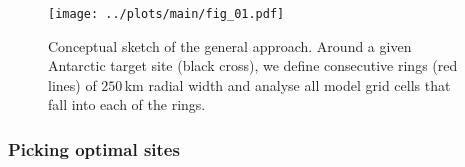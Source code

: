\documentclass[cp, manuscript, draft]{copernicus}
\begin{document}
\begin{figure}[t]%
\centering
\texttt{[image: ../plots/main/fig\_01.pdf]}
\caption[Conceptual approach]{%
  Conceptual sketch of the general approach. Around a given Antarctic target
  site (black cross), we define consecutive rings (red lines) of $250$\,km
  radial width and analyse all model grid cells that fall into each of the
  rings.}
\label{fig:concept}%
\end{figure}%




\subsubsection{Picking optimal sites}\label{methods:picking}
\end{document}
